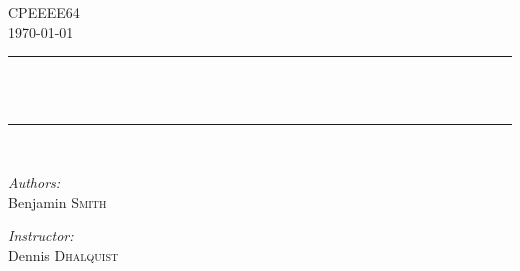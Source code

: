 \begin{titlepage}
	\begin{center}
		\vspace{20 cm}
		\textsc{\LARGE CPE\/EEE64}\\[1.3cm]
		\textsc{\Large \today}\\[0.5cm]
		\vspace{5 mm}
		
		\rule{415pt}{2pt}\\
		{ \huge \bfseries \TITLE \\[0.2cm] }
		\rule{415pt}{2pt}\\
		\vspace{10mm}
		\begin{minipage}{0.4\textwidth}
			\begin{flushleft} \large
			\emph{Authors:}\\
				Benjamin		\textsc{Smith}\\
			\end{flushleft}
		\end{minipage}
		\begin{minipage}{0.4\textwidth}
			\begin{flushright} \large
				\emph{Instructor:} \\
				Dennis 	\textsc{Dhalquist}\\
			\end{flushright}
		\end{minipage}
	\end{center}
	
	\vspace{30mm}
	
	\begin{center}
		\begin{minipage}{.9\textwidth}
			\begin{flushleft} \large
				\begin{abstract}
					\ABSTRACT \\
				\end{abstract}
			\end{flushleft}
		\end{minipage}
	\end{center}
	\vfill

\end{titlepage}